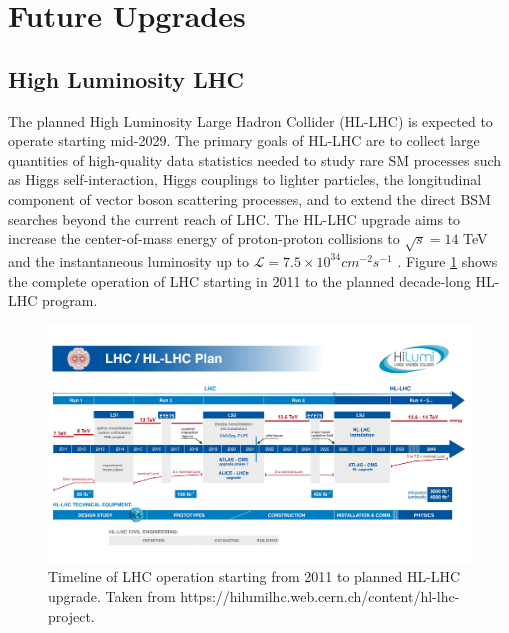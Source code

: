 \section{Future Upgrades}
\label{sec:FutureUpgrades}

\subsection{High Luminosity LHC}
\label{subsec:HLLHC}
The planned High Luminosity Large Hadron Collider (HL-LHC) is expected to operate starting mid-2029. The primary goals of HL-LHC are to collect large quantities of high-quality data statistics needed to study rare SM processes such as Higgs self-interaction, Higgs couplings to lighter particles, the longitudinal component of vector boson scattering processes, and to extend the direct BSM searches beyond the current reach of LHC. The HL-LHC upgrade aims to increase the center-of-mass energy of proton-proton collisions to $\sqrt{s}=14$ TeV and the instantaneous luminosity up to $\mathcal L = 7.5 \times 10^{34} cm^{-2}s^{-1}$ \cite{HLLHC}. Figure \ref{fig:HLLHC} shows the complete operation of LHC starting in 2011 to the planned decade-long HL-LHC program. 

\begin{figure}[!htb]
    \centering
    \includegraphics[width=.95\linewidth]{figures/LHC/HLLHCPlan.jpeg}
    \caption{ Timeline of LHC operation starting from 2011 to planned HL-LHC upgrade. Taken from \small{https://hilumilhc.web.cern.ch/content/hl-lhc-project}.\label{fig:HLLHC}}
\end{figure}
\normalsize

